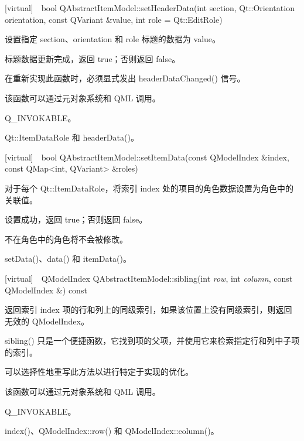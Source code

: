 [virtual] bool QAbstractItemModel::setHeaderData(int section, Qt::Orientation orientation, const QVariant \&value, int role = Qt::EditRole)

设置指定 section、orientation 和 role 标题的数据为 value。

标题数据更新完成，返回 true；否则返回 false。

在重新实现此函数时，必须显式发出 headerDataChanged() 信号。

\begin{notice}
该函数可以通过元对象系统和 QML 调用。
\end{notice}

\begin{seeAlso}
Q\_INVOKABLE。
\end{seeAlso}

  
\begin{seeAlso}
Qt::ItemDataRole 和 headerData()。
\end{seeAlso}

[virtual] bool QAbstractItemModel::setItemData(const QModelIndex \&index, const QMap<int, QVariant> \&roles)

对于每个 Qt::ItemDataRole，将索引 index 处的项目的角色数据设置为角色中的关联值。

设置成功，返回 true；否则返回 false。

不在角色中的角色将不会被修改。

\begin{seeAlso}
setData()、data() 和 itemData()。
\end{seeAlso}

[virtual] QModelIndex QAbstractItemModel::sibling(int \emph{row}, int \emph{column}, const QModelIndex \&) const

返回索引 index 项的行和列上的同级索引，如果该位置上没有同级索引，则返回无效的 QModelIndex。

sibling() 只是一个便捷函数，它找到项的父项，并使用它来检索指定行和列中子项的索引。

可以选择性地重写此方法以进行特定于实现的优化。

\begin{notice}
该函数可以通过元对象系统和 QML 调用。
\end{notice}

\begin{seeAlso}
Q\_INVOKABLE。
\end{seeAlso}

\begin{seeAlso}
index()、QModelIndex::row() 和 QModelIndex::column()。
\end{seeAlso}


